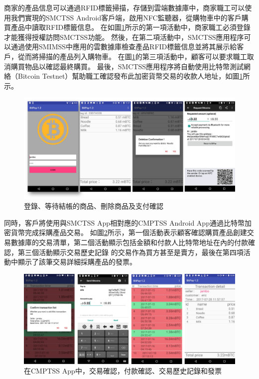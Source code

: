 商家的產品信息可以通過RFID標籤掃描，存儲到雲端數據庫中，商家職工可以使用我們實現的SMCTSS Android客戶端，啟用NFC監聽器，從購物車中的客戶購買產品中讀取RFID標籤信息。 在如圖\ref{fig7}所示的第一項活動中，商家職工必須登錄才能獲得授權訪問SMCTSS功能。 然後，在第二項活動中，SMCTSS應用程序可以通過使用SMIMSS中應用的雲數據庫檢查產品RFID標籤信息並將其展示給客戶，從而將掃描的產品列入購物車。 在圖\ref{fig7}的第三項活動中，顧客可以要求職工取消購買物品以確認最終購買。 最後，SMCTSS應用程序將自動使用比特幣測試網絡（Bitcoin Testnet）\supercite{bitcointestnet}幫助職工確認發布此加密貨幣交易的收款人地址，如圖\ref{fig7}所示。    

\begin{figure}[htbp]
	\centering
	\includegraphics[width = 1\textwidth]{fig7.png}
	\caption{登錄、等待結帳的商品、刪除商品及支付確認}\label{fig7}
\end{figure}

同時，客戶將使用與SMCTSS App相對應的CMPTSS Android App通過比特幣加密貨幣完成採購產品交易。 如圖\ref{fig8}所示，第一個活動表示顧客確認購買產品創建交易數據庫的交易清單，第二個活動顯示包括金額和付款人比特幣地址在內的付款確認，第三個活動顯示交易歷史記錄 的交易作為買方甚至是賣方，最後在第四項活動中顯示了該筆交易詳細採購產品的發票。    

\begin{figure}[htbp]
	\centering
	\includegraphics[width = 1\textwidth]{fig8.png}
	\caption{在CMPTSS App中，交易確認，付款確認、交易歷史記錄和發票}\label{fig8}
\end{figure}